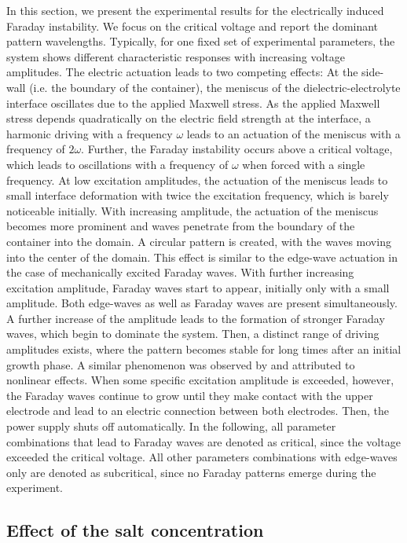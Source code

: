 \documentclass{jfm_arxiv}
\begin{document}
In this section, we present the experimental results for the electrically induced Faraday instability.
We focus on the critical voltage and report the dominant pattern wavelengths.
Typically, for one fixed set of experimental parameters, the system shows different characteristic responses with increasing voltage amplitudes. The electric actuation leads to two competing effects: At the side-wall (i.e. the boundary of the container), the meniscus of the dielectric-electrolyte interface oscillates due to the applied Maxwell stress. As the applied Maxwell stress depends quadratically on the electric field strength at the interface, a harmonic driving with a frequency $\omega$ leads to an actuation of the meniscus with a frequency of $2 \omega$. Further, the Faraday instability occurs above a critical voltage, which leads to oscillations with a frequency of $\omega$ when forced with a single frequency. 
At low excitation amplitudes, the actuation of the meniscus leads to small interface deformation with twice the excitation frequency, which is barely noticeable initially. 
With increasing amplitude, the actuation of the meniscus becomes more prominent and waves penetrate from the boundary of the container into the domain. 
A circular pattern is created, with the waves moving into the center of the domain. 
This effect is similar to the edge-wave actuation in the case of mechanically excited Faraday waves.
With further increasing excitation amplitude, Faraday waves start to appear, initially only with a small amplitude. Both edge-waves as well as Faraday waves are present simultaneously. 
A further increase of the amplitude leads to the formation of stronger Faraday waves, which begin to dominate the system. 
Then, a distinct range of driving amplitudes exists, where the pattern becomes stable for long times after an initial growth phase.
A similar phenomenon was observed by \citet{Pillai2018} and attributed to nonlinear effects. 
When some specific excitation amplitude is exceeded, however, the Faraday waves continue to grow until they make contact with the upper electrode and lead to an electric connection between both electrodes.
Then, the power supply shuts off automatically. 
In the following, all parameter combinations that lead to Faraday waves are denoted as critical, since the voltage exceeded the critical voltage.
All other parameters combinations with edge-waves only are denoted as subcritical, since no Faraday patterns emerge during the experiment. 

\subsection{Effect of the salt concentration}
\label{subsec:results_saltvariation}
\end{document}
